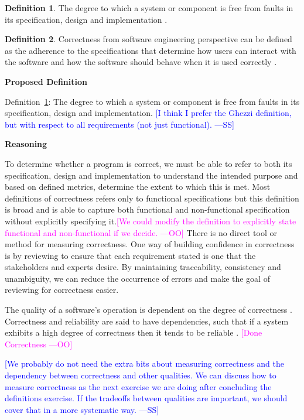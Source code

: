 \documentclass[letterpaper,cleveref]{lipics-v2019}
\newcommand{\authornote}[3]{\textcolor{#1}{[#3 ---#2]}}
\newcommand{\authornote}[3]{}
\newcommand{\wss}[1]{\authornote{blue}{SS}{#1}} %
\newcommand{\oo}[1]{\authornote{magenta}{OO}{#1}} %
\theoremstyle{definition}
\newtheorem{defn}{Definition}
\begin{document}
\begin{defn} \label{Correctness_Selected} 
  The degree to which a system or component is free from faults in its
  specification, design and implementation \citep{IEEEComputerDictionary1991}.
\end{defn}

\begin{defn}
  Correctness from software engineering perspective can be defined as the
  adherence to the specifications that determine how users can interact with the
  software and how the software should behave when it is used correctly
  \citep{Tutorialspoint}.
\end{defn}

\noindent \textbf{Proposed Definition}

Definition~\ref{Correctness_Selected}: The degree to which a system or component
is free from faults in its specification, design and implementation.  \wss{I
  think I prefer the Ghezzi definition, but with respect to all requirements
  (not just functional).}

\noindent \textbf{Reasoning}

To determine whether a program is correct, we must be able to refer to both its
specification, design and implementation to understand the intended purpose and
based on defined metrics, determine the extent to which this is met. Most
definitions of correctness refers only to functional specifications but this
definition is broad and is able to capture both functional and non-functional
specification without explicitly specifying it.\oo{We could modify the
  definition to explicitly state functional and non-functional if we decide.}
There is no direct tool or method for measuring correctness. One way of building
confidence in correctness is by reviewing to ensure that each requirement stated
is one that the stakeholders and experts desire.  By maintaining traceability,
consistency and unambiguity, we can reduce the occurrence of errors and make the
goal of reviewing for correctness easier.

The quality of a software's operation is dependent on the degree of correctness
\citep{berander2005software}. Correctness and reliability are said to have
dependencies, such that if a system exhibits a high degree of correctness then
it tends to be reliable \citep{GhezziEtAl2003}. \oo{Done Correctness}

\wss{We probably do not need the extra bits about measuring correctness and the
  dependency between correctness and other qualities.  We can discuss how to
  measure correctness as the next exercise we are doing after concluding the
  definitions exercise.  If the tradeoffs between qualities are important, we
  should cover that in a more systematic way.}
\end{document}
